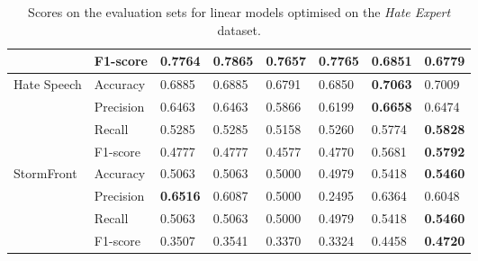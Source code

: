 \begin{table}[]
\begin{minipage}{0.42\paperheight}
{\begin{tabular}{ll|ll|ll|ll}
                                       & F1-score  & 0.7764      & \bf{0.7865}  & 0.7657      & 0.7765     & 0.6851      & 0.6779       \\ \hline
    \multirow{4}{*}{Hate Speech}       & Accuracy  & 0.6885      & 0.6885       & 0.6791      & 0.6850     & \bf{0.7063} & 0.7009       \\
                                       & Precision & 0.6463      & 0.6463       & 0.5866      & 0.6199     & \bf{0.6658} & 0.6474       \\
                                       & Recall    & 0.5285      & 0.5285       & 0.5158      & 0.5260     & 0.5774      & \bf{0.5828}  \\
                                       & F1-score  & 0.4777      & 0.4777       & 0.4577      & 0.4770     & 0.5681      & \bf{0.5792}  \\ \hline
    \multirow{4}{*}{StormFront}        & Accuracy  & 0.5063      & 0.5063       & 0.5000      & 0.4979     & 0.5418      & \bf{0.5460}  \\
                                       & Precision & \bf{0.6516} & 0.6087       & 0.5000      & 0.2495     & 0.6364      & 0.6048       \\
                                       & Recall    & 0.5063      & 0.5063       & 0.5000      & 0.4979     & 0.5418      & \bf{0.5460}  \\
                                       & F1-score  & 0.3507      & 0.3541       & 0.3370      & 0.3324     & 0.4458      & \bf{0.4720}
    \end{tabular}%
    }    
    \caption{Scores on the evaluation sets for  linear models optimised on the \textit{Hate Expert} dataset.}
    \label{tab:linear_hateExp_baselines}
    \vfill
    

\end{minipage}
\end{table}
